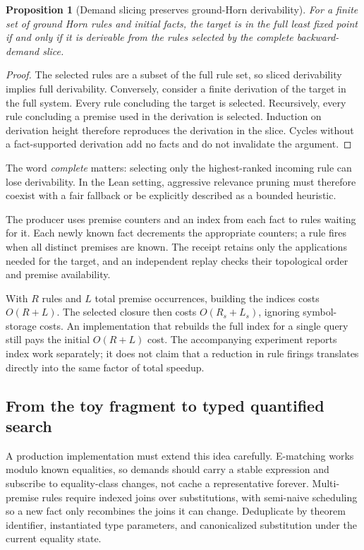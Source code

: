\documentclass[11pt,letterpaper]{article}
\newcommand{\Lean}{\textsf{Lean}}
\newtheorem{proposition}{Proposition}[section]
\theoremstyle{definition}
\theoremstyle{remark}
\begin{document}
\begin{proposition}[Demand slicing preserves ground-Horn derivability]
For a finite set of ground Horn rules and initial facts, the target is in the full least fixed point if and only if it is derivable from the rules selected by the complete backward-demand slice.
\end{proposition}
\begin{proof}
The selected rules are a subset of the full rule set, so sliced derivability implies full derivability. Conversely, consider a finite derivation of the target in the full system. Every rule concluding the target is selected. Recursively, every rule concluding a premise used in the derivation is selected. Induction on derivation height therefore reproduces the derivation in the slice. Cycles without a fact-supported derivation add no facts and do not invalidate the argument.
\end{proof}
The word \emph{complete} matters: selecting only the highest-ranked incoming rule can lose derivability. In the \Lean{} setting, aggressive relevance pruning must therefore coexist with a fair fallback or be explicitly described as a bounded heuristic.

The producer uses premise counters and an index from each fact to rules waiting for it. Each newly known fact decrements the appropriate counters; a rule fires when all distinct premises are known. The receipt retains only the applications needed for the target, and an independent replay checks their topological order and premise availability.

With $R$ rules and $L$ total premise occurrences, building the indices costs $O(R+L)$. The selected closure then costs $O(R_s+L_s)$, ignoring symbol-storage costs. An implementation that rebuilds the full index for a single query still pays the initial $O(R+L)$ cost. The accompanying experiment reports index work separately; it does not claim that a reduction in rule firings translates directly into the same factor of total speedup.

\subsection{From the toy fragment to typed quantified search}
A production implementation must extend this idea carefully. E-matching works modulo known equalities, so demands should carry a stable expression and subscribe to equality-class changes, not cache a representative forever. Multi-premise rules require indexed joins over substitutions, with semi-naive scheduling so a new fact only recombines the joins it can change. Deduplicate by theorem identifier, instantiated type parameters, and canonicalized substitution under the current equality state.
\end{document}
